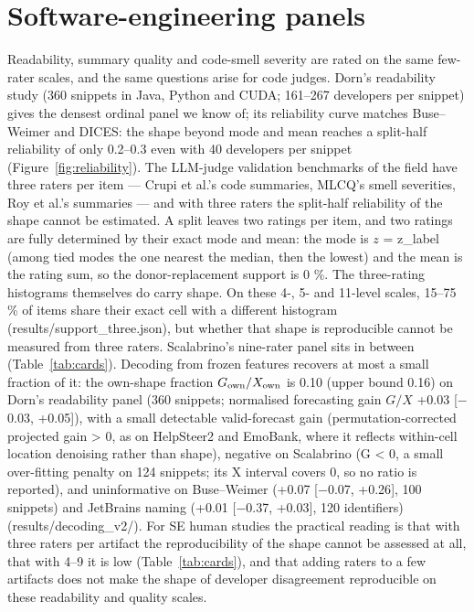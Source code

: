 \documentclass[10pt]{article}
\begin{document}
\section{Software-engineering panels}

Readability, summary quality and code-smell severity are rated on the same few-rater scales, and the same questions arise for code judges. Dorn's readability study (360 snippets in Java, Python and CUDA; 161--267 developers per snippet) gives the densest ordinal panel we know of; its reliability curve matches Buse--Weimer and DICES: the shape beyond mode and mean reaches a split-half reliability of only 0.2--0.3 even with 40 developers per snippet (Figure~\ref{fig:reliability}). The LLM-judge validation benchmarks of the field have three raters per item --- Crupi et al.'s code summaries, MLCQ's smell severities, Roy et al.'s summaries --- and with three raters the split-half reliability of the shape cannot be estimated. A split leaves two ratings per item, and two ratings are fully determined by their exact mode and mean: the mode is \(z\) = z\_label (among tied modes the one nearest the median, then the lowest) and the mean is the rating sum, so the donor-replacement support is 0 \%. The three-rating histograms themselves do carry shape. On these 4-, 5- and 11-level scales, 15--75 \% of items share their exact cell with a different histogram (results/support\_three.json), but whether that shape is reproducible cannot be measured from three raters. Scalabrino's nine-rater panel sits in between (Table~\ref{tab:cards}). Decoding from frozen features recovers at most a small fraction of it: the own-shape fraction \(G_{\rm own}/X_{\rm own}\) is 0.10 (upper bound 0.16) on Dorn's readability panel (360 snippets; normalised forecasting gain \(G/X\) +0.03 {[}$-$0.03, +0.05{]}), with a small detectable valid-forecast gain (permutation-corrected projected gain \textgreater{} 0, as on HelpSteer2 and EmoBank, where it reflects within-cell location denoising rather than shape), negative on Scalabrino (G \textless{} 0, a small over-fitting penalty on 124 snippets; its X interval covers 0, so no ratio is reported), and uninformative on Buse--Weimer (+0.07 {[}$-$0.07, +0.26{]}, 100 snippets) and JetBrains naming (+0.01 {[}$-$0.37, +0.03{]}, 120 identifiers) (results/decoding\_v2/). For SE human studies the practical reading is that with three raters per artifact the reproducibility of the shape cannot be assessed at all, that with 4--9 it is low (Table~\ref{tab:cards}), and that adding raters to a few artifacts does not make the shape of developer disagreement reproducible on these readability and quality scales.
\end{document}
